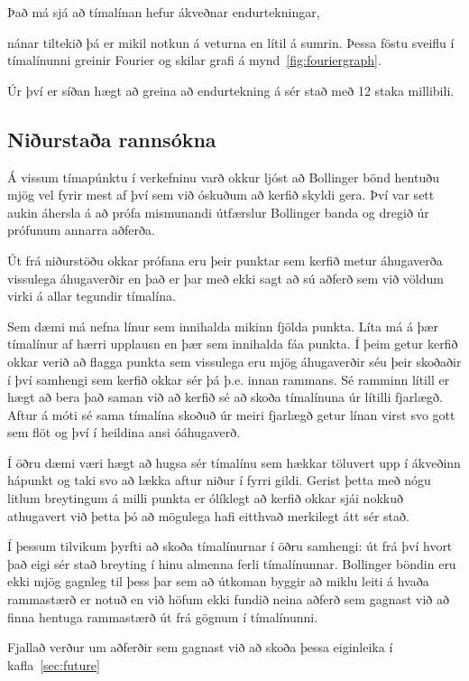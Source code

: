 \documentclass{article}
\begin{document}
Það má sjá að tímalínan hefur ákveðnar endurtekningar,

nánar tiltekið þá er mikil notkun á veturna en lítil á sumrin.
Þessa föstu sveiflu í tímalínunni greinir Fourier og skilar grafi á mynd~\ref{fig:fouriergraph}. 

Úr því er síðan hægt að greina að endurtekning á sér stað með 12 staka
millibili.

\subsection{Niðurstaða rannsókna}
Á vissum tímapúnktu í verkefninu varð okkur ljóst að Bollinger bönd hentuðu
mjög vel fyrir mest af því sem við óskuðum að kerfið skyldi gera.
Því var sett aukin áhersla á að prófa mismunandi útfærslur Bollinger banda og
dregið úr prófunum annarra aðferða.

Út frá niðurstöðu okkar prófana eru þeir punktar sem kerfið metur
áhugaverða vissulega áhugaverðir en það er þar með ekki sagt að
sú aðferð sem við völdum virki á allar tegundir tímalína. 

Sem dæmi má nefna línur sem innihalda mikinn fjölda punkta.
Líta má á þær tímalínur af \ilqq hærri\irqq \hspace{1pt} upplausn en þær sem innihalda fáa punkta. Í
þeim getur kerfið okkar verið að flagga punkta sem vissulega eru mjög
áhugaverðir séu þeir skoðaðir í því samhengi sem kerfið okkar sér þá þ.e. innan
rammans. Sé ramminn lítill er hægt að bera það saman við að kerfið sé að skoða
tímalínuna úr lítilli fjarlægð. Aftur á móti sé sama tímalína skoðuð úr meiri
fjarlægð getur línan virst svo gott sem flöt og því í heildina ansi óáhugaverð.

Í öðru dæmi væri hægt að hugsa sér tímalínu sem hækkar töluvert upp í ákveðinn
hápunkt og taki svo að lækka aftur niður í fyrri gildi. Gerist þetta með nógu
litlum breytingum á milli punkta er ólíklegt að kerfið okkar sjái nokkuð
athugavert við þetta þó að mögulega hafi eitthvað merkilegt átt sér stað. 

Í þessum tilvikum þyrfti að skoða tímalínurnar í öðru samhengi: út frá því hvort
það eigi sér stað breyting í hinu almenna ferli tímalínunnar. Bollinger böndin
eru ekki mjög gagnleg til þess þar sem að útkoman byggir að miklu leiti á hvaða
rammastærð er notuð en við höfum ekki fundið neina aðferð sem gagnast við að
finna hentuga rammastærð út frá gögnum í tímalínunni.

Fjallað verður um aðferðir sem gagnast við að skoða þessa eiginleika í kafla~\ref{sec:future}
\end{document}
